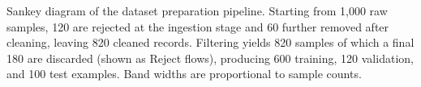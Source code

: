 \caption{Sankey diagram of the dataset preparation pipeline. Starting from 1{,}000 raw samples, 120 are rejected at the ingestion stage and 60 further removed after cleaning, leaving 820 cleaned records. Filtering yields 820 samples of which a final 180 are discarded (shown as Reject flows), producing 600 training, 120 validation, and 100 test examples. Band widths are proportional to sample counts.}

